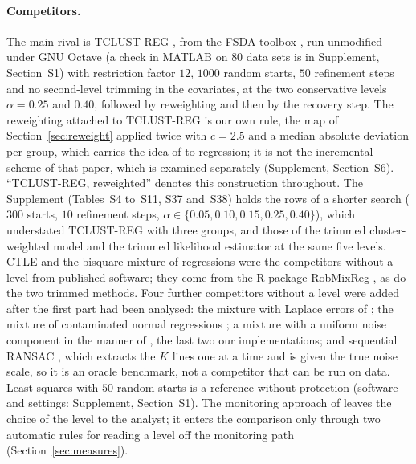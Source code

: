 \paragraph{Competitors.} The main rival is TCLUST-REG \citep{garciaescudero2010robust}, from the
FSDA toolbox \citep{riani2012fsda}, run unmodified under GNU Octave (a check in MATLAB on $80$ data sets is in Supplement, Section~S1) with restriction factor $12$,
$1000$ random starts, $50$ refinement steps and no second-level trimming in the covariates, at
the two conservative levels $\alpha=0.25$ and $0.40$, followed by reweighting and then by the
recovery step. The reweighting attached to TCLUST-REG is our own rule, the map of
Section~\ref{sec:reweight} applied twice with $c=2.5$ and a median absolute deviation per group,
which carries the idea of \citet{dotto2018reweighting} to regression; it is not the incremental
scheme of that paper, which is examined separately (Supplement, Section~S6). ``TCLUST-REG,
reweighted'' denotes this construction throughout. The Supplement (Tables~S4 to~S11, S37
and~S38) holds the rows of a shorter search ($300$ starts, $10$ refinement steps,
$\alpha\in\{0.05,0.10,0.15,0.25,0.40\}$), which understated TCLUST-REG with three groups,
and those of the trimmed cluster-weighted model \citep{garciaescudero2017robust} and the
trimmed likelihood estimator \citep{neykov2007robust} at the same five levels. CTLE
\citep{chang2020componentwise} and the bisquare mixture of regressions \citep{bai2012robust}
were the competitors without a level from published software; they come from the R package
RobMixReg \citep{cao2026robmixreg}, as do the two trimmed methods. Four further competitors without a level were added after the first part had
been analysed: the mixture with Laplace errors of \citet{song2014robust}; the mixture of
contaminated normal regressions \citep{punzo2017robust,mazza2020mixtures}; a mixture with a
uniform noise component in the manner of \citet{banfield1993model}, the last two our
implementations; and sequential RANSAC \citep{fischler1981random}, which extracts the $K$
lines one at a time and is given the true noise scale, so it is an oracle benchmark, not a
competitor that can be run on data. Least squares with $50$ random starts is a reference
without protection (software and settings: Supplement, Section~S1). The monitoring approach
of \citet{torti2019assessing} leaves the choice of the level to the analyst; it enters the
comparison only through two automatic rules for reading a level off the monitoring path
(Section~\ref{sec:measures}).

